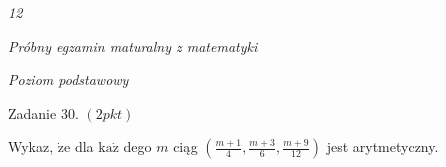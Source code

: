\documentclass[a4paper,12pt]{article}
\begin{document}
{\it 12}

{\it Próbny egzamin maturalny z matematyki}

{\it Poziom podstawowy}

Zadanie 30. $(2pkt)$

Wykaz, $\dot{\mathrm{z}}\mathrm{e}$ dla $\mathrm{k}\mathrm{a}\dot{\mathrm{z}}$ dego $m$ ciąg $(\displaystyle \frac{m+1}{4},\frac{m+3}{6},\frac{m+9}{12})$ jest arytmetyczny.
\end{document}
